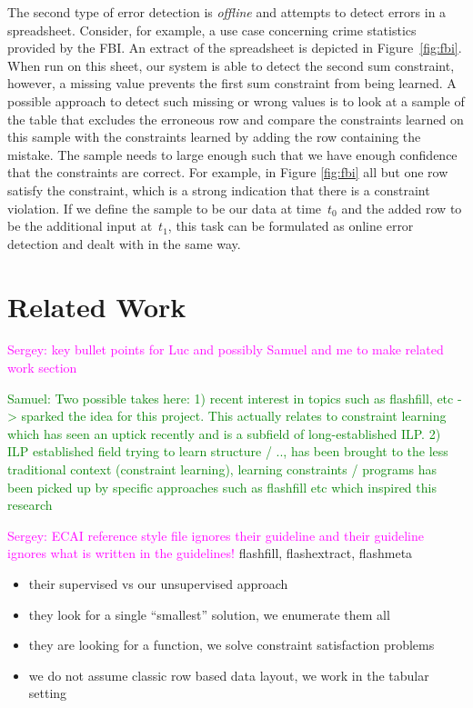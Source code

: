 \documentclass{IEEEtran}
\newcommand{\sergey}[1]{\textcolor{magenta}{{\sc Sergey:} #1}\xspace}
\newcommand{\samuel}[1]{\textcolor{green}{{\sc Samuel:} #1}\xspace}
\theoremstyle{definition}
\begin{document}
The second type of error detection is \textit{offline} and attempts to detect errors in a spreadsheet.
Consider, for example, a use case concerning crime statistics provided by the FBI.
An extract of the spreadsheet is depicted in Figure~\ref{fig:fbi}.
When run on this sheet, our system is able to detect the second sum constraint, however, a missing value prevents the first sum constraint from being learned.
A possible approach to detect such missing or wrong values is to look at a sample of the table that excludes the erroneous row and compare the constraints learned on this sample with the constraints learned by adding the row containing the mistake.
The sample needs to large enough such that we have enough confidence that the constraints are correct. For example, in Figure \ref{fig:fbi} all but one row satisfy the constraint, which is a strong indication that there is a constraint violation.
If we define the sample to be our data at time~$t_0$ and the added row to be the additional input at~$t_1$, this task can be formulated as online error detection and dealt with in the same way.

\section{Related Work}\label{sec:related_work}
\sergey{key bullet points for Luc and possibly Samuel and me to make related work section}

\samuel{Two possible takes here: 1) recent interest in topics such as flashfill, etc -> sparked the idea for this project. This actually relates to constraint learning which has seen an uptick recently and is a subfield of long-established ILP. 2) ILP established field trying to learn structure / .., has been brought to the less traditional context (constraint learning), learning constraints / programs has been picked up by specific approaches such as flashfill etc which inspired this research}

\sergey{ECAI reference style file ignores their guideline and their guideline ignores what is written in the guidelines!}
flashfill, flashextract, flashmeta \cite{flashfill,flashextract,flashmeta}
\begin{itemize}
  \item their supervised vs our unsupervised approach
  \item they look for a single ``smallest'' solution, we enumerate them all
  \item they are looking for a function, we solve constraint satisfaction problems
  \item we do not assume classic row based data layout, we work in the tabular setting
\end{itemize}
\end{document}
